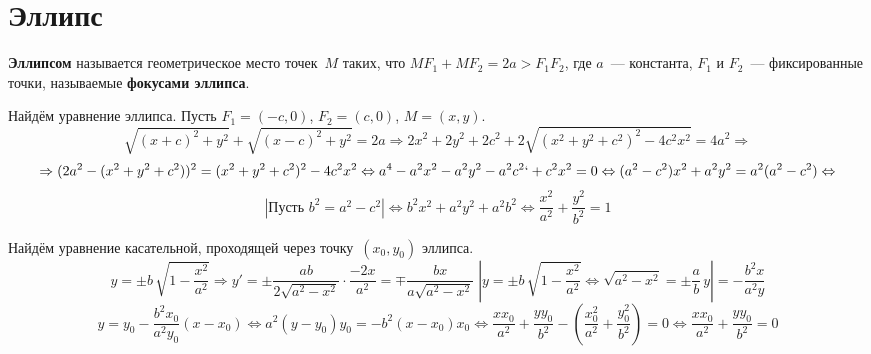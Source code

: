 \section{Эллипс}
 \textbf{Эллипсом} называется геометрическое место точек~$M$ таких, что $MF_1 + MF_2 = 2a > F_1 F_2$, где $a$~--- константа, $F_1$ и $F_2$~--- фиксированные точки, называемые \textbf{фокусами эллипса}.

Найдём уравнение эллипса.
Пусть $F_1 = (-c, 0)$, $F_2 = (c, 0)$, $M = (x, y)$.
\begin{equation*}
\sqrt{(x + c)^2 + y^2} + \sqrt{(x - c)^2 + y^2} = 2a \Rightarrow
2x^2 + 2y^2 + 2c^2 + 2\sqrt{(x^2 + y^2 + c^2)^2 - 4c^2 x^2} = 4a^2 \Rightarrow
\end{equation*}
\begin{equation*}
\Rightarrow (2a^2 - (x^2 + y^2 + c^2))^2 = (x^2 + y^2 + c^2)^2 - 4c^2 x^2 \Leftrightarrow
a^4 - a^2 x^2 - a^2 y^2 - a^2 c^2`+ c^2 x^2 = 0 \Leftrightarrow
(a^2 - c^2) x^2 + a^2 y^2 = a^2 (a^2 - c^2) \Leftrightarrow
\end{equation*}
\begin{equation*}
\left|\text{Пусть $b^2 = a^2 - c^2$}\right|
\Leftrightarrow b^2 x^2 + a^2 y^2 + a^2 b^2 \Leftrightarrow
\frac{x^2}{a^2} + \frac{y^2}{b^2} = 1
\end{equation*}

Найдём уравнение касательной, проходящей через точку~$(x_0, y_0)$ эллипса.
\begin{equation*}
y = \pm b\,\sqrt{1 - \frac{x^2}{a^2}} \Rightarrow
y' = \pm\frac{ab}{2\sqrt{a^2 - x^2}} \cdot \frac{-2x}{a^2} =
\mp\frac{bx}{a\sqrt{a^2 - x^2}} \;
\left|y = \pm b\,\sqrt{1 - \frac{x^2}{a^2}} \Leftrightarrow
\sqrt{a^2 - x^2} = \pm\frac{a}b\,y\right| =
-\frac{b^2 x}{a^2 y}
\end{equation*}
\begin{equation*}
y = y_0 - \frac{b^2 x_0}{a^2 y_0} (x - x_0) \Leftrightarrow
a^2 (y - y_0) y_0 = -b^2 (x - x_0) x_0 \Leftrightarrow
\frac{x x_0}{a^2} + \frac{y y_0}{b^2} - \left(\frac{x_0^2}{a^2} + \frac{y_0^2}{b^2} \right) = 0 \Leftrightarrow
\frac{x x_0}{a^2} + \frac{y y_0}{b^2} = 0
\end{equation*}